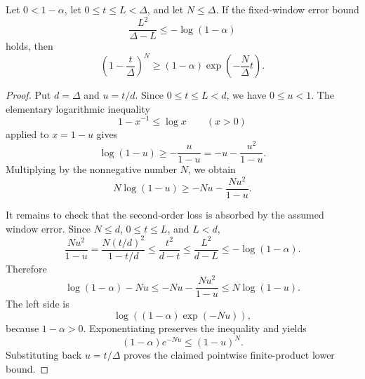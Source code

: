 \begin{helper}
Let \(0<1-\alpha\), let \(0\le t\le L<\Delta\), and let
\(N\le\Delta\).  If the fixed-window error bound
\[
\frac{L^2}{\Delta-L}\le -\log(1-\alpha)
\]
holds, then
\[
\left(1-\frac t\Delta\right)^N
\ge
(1-\alpha)\exp\left(-\frac N\Delta t\right).
\]
\end{helper}
\begin{proof}
Put \(d=\Delta\) and \(u=t/d\).  Since \(0\le t\le L<d\), we have
\(0\le u<1\).  The elementary logarithmic inequality
\[
1-x^{-1}\le \log x\qquad (x>0)
\]
applied to \(x=1-u\) gives
\[
\log(1-u)\ge -\frac{u}{1-u}
= -u-\frac{u^2}{1-u}.
\]
Multiplying by the nonnegative number \(N\), we obtain
\[
N\log(1-u)\ge
-Nu-\frac{Nu^2}{1-u}.
\]

It remains to check that the second-order loss is absorbed by the assumed
window error.  Since \(N\le d\), \(0\le t\le L\), and \(L<d\),
\[
\frac{Nu^2}{1-u}
=\frac{N(t/d)^2}{1-t/d}
\le \frac{t^2}{d-t}
\le \frac{L^2}{d-L}
\le -\log(1-\alpha).
\]
Therefore
\[
\log(1-\alpha)-Nu
\le
-Nu-\frac{Nu^2}{1-u}
\le N\log(1-u).
\]
The left side is
\[
\log\left((1-\alpha)\exp(-Nu)\right),
\]
because \(1-\alpha>0\).  Exponentiating preserves the inequality and yields
\[
(1-\alpha)e^{-Nu}\le (1-u)^N.
\]
Substituting back \(u=t/\Delta\) proves the claimed pointwise finite-product
lower bound.
\end{proof}
